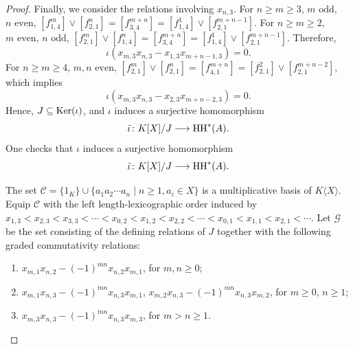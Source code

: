 \documentclass[10pt, reqno]{amsart}
\theoremstyle{definition}
\theoremstyle{remark}
\numberwithin{equation}{section}
\begin{document}
\begin{proof}
Finally, we consider the relations involving \(x_{n,3}\).
For \(n\ge m \ge 3\), \(m \text{ odd}\), \(n \text{ even}\), \( [f_{1,4}^m ]\lor [f_{2,1}^n]= [f_{3,4}^{m+n}] = [f_{1,4}^1] \lor [f_{2,1}^{m+n-1}] \). For \(n\ge m\ge 2\), \(m \text{ even}\), \(n \text{ odd}\), \( [f_{2,1}^m] \lor [f_{1,4}^n]= [f_{3,4}^{m+n}] = [f_{1,4}^1] \lor [f_{2,1}^{m+n-1}]\). Therefore, 
\[\iota (x_{m,3}x_{n,3}-x_{1,3}x_{m+n-1,3}) =0.\]
For \(n\ge m \ge 4\), \(m, n \text{ even}\), \( [f_{2,1}^m] \lor [f_{2,1}^n]= [f_{4,1}^{m+n}] = [f_{2,1}^2] \lor [f_{2,1}^{m+n-2}] \), which implies 
\[\iota (x_{m,3}x_{n,3}-x_{2,3}x_{m+n-2,3}) =0.\] 
Hence, \( J \subseteq \mathrm{Ker}(\iota)\), and \(\iota\) induces a surjective homomorphism
\[ \bar{\iota} \colon K[X]/J \longrightarrow \mathrm{HH}^*(A).\]
\fi
One checks that \(\iota\) induces a surjective homomorphism
\[ \bar{\iota} \colon K[X]/J \longrightarrow \mathrm{HH}^*(A).\]

The set \(\mathcal{C}=\{1_K\}\cup \{a_1a_2\cdots a_n\mid n\ge 1, a_i\in X\}\) is a multiplicative basis of \(K\langle X \rangle\). Equip  \(\mathcal{C}\) with the left length-lexicographic order induced by
\(x_{1,3}<x_{2,3}<x_{3,3}<\cdots<x_{0,2}<x_{1,2}<x_{2,2}<\cdots <x_{0,1}<x_{1,1}<x_{2,1}<\cdots\). Let \(\mathscr{G}\) be the set consisting of the defining relations of \(J\) together with the following graded commutativity relations:
\begin{enumerate}
    \item \(x_{m,1} x_{n,2}-(-1)^{mn}x_{n,2}x_{m,1}\), for \(m,n \ge 0\);
    \item \(x_{m,1}x_{n,3}-(-1)^{mn}x_{n,3}x_{m,1}\), \(x_{m,2}x_{n,3}-(-1)^{mn}x_{n,3}x_{m,2}\), for \(m\ge 0\), \(n\ge 1\);
     \item \(x_{m,3}x_{n,3}-(-1)^{mn}x_{n,3}x_{m,3}\), for \(m>n\ge 1\).
\end{enumerate}


\end{proof}
\end{document}
